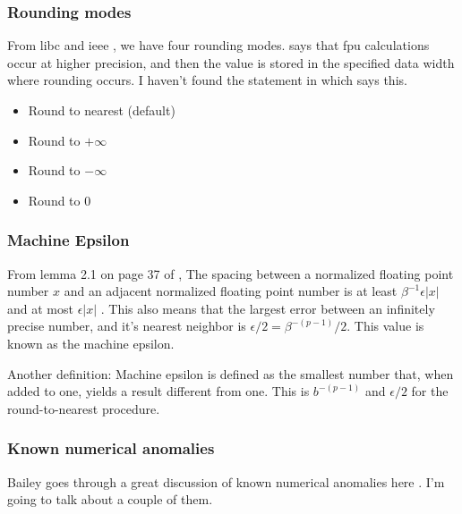\documentclass[american]{article}
\begin{document}
\subsubsection{Rounding modes} \label{sec:precision-ieee-round}

From libc and ieee \cite{gnu-libc-rounding,ieee-754-2008}, we have four rounding modes. \cite{gnu-libc-rounding} says that fpu calculations occur at higher precision, and then the value is stored in the specified data width where rounding occurs. I haven't found the statement in \cite{ieee-754-2008} which says this.

\begin{itemize}
\item Round to nearest (default)
\item Round to $+\infty$
\item Round to $-\infty$
\item Round to 0
\end{itemize}

\subsubsection{Machine Epsilon} \label{sec:precision-ieee-epsilon}

From lemma 2.1 on page 37 of \cite{higham-numerical-accuracy-and-stability}, The spacing between a normalized floating point number $x$ and an adjacent normalized floating point number is at least $\beta^{-1}\epsilon|x|$ and at most $\epsilon|x|$ \cite{higham-numerical-accuracy-and-stability}. This also means that the largest error between an infinitely precise number, and it's nearest neighbor is $\epsilon/2 = \beta^{-(p-1)}/2$. This value is known as the machine epsilon.

Another definition: Machine epsilon is defined as the smallest number that, when added to one, yields a result different from one. This is $b^{-(p-1)}$ and $\epsilon/2$ for the round-to-nearest procedure.

\subsubsection{Known numerical anomalies} \label{sec:precision-ieee-anomalies}

Bailey goes through a great discussion of known numerical anomalies here \cite{dhb-numerical-bugs}. I'm going to talk about a couple of them.
\end{document}
